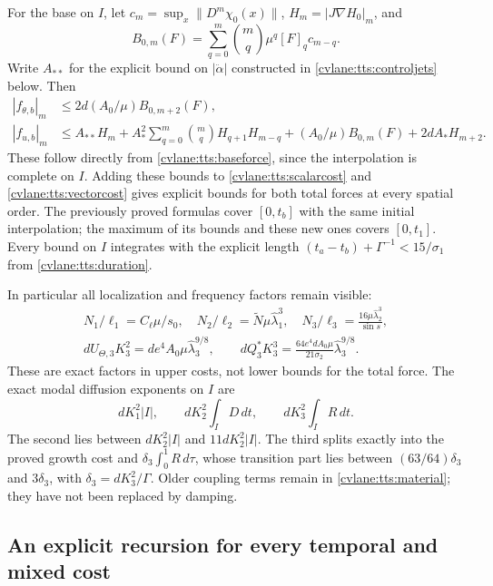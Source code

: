 For the base on $I$, let
$c_m=\sup_x\|D^m\chi_0(x)\|$, $H_m=|J\nabla H_0|_m$, and
\[
 B_{0,m}(F)=\sum_{q=0}^m\binom mq\mu^q[F]_qc_{m-q}.
\]
Write $A_{**}$ for the explicit bound on $|\ddot\alpha|$
constructed in \eqref{cvlane:tts:controljets} below. Then
\begin{align}\label{cvlane:tts:basecost}
 |f_{\theta,b}|_m&\leq2d(A_0/\mu)B_{0,m+2}(F),\nonumber\\
 |f_{u,b}|_m&\leq A_{**}H_m+
 A_*^2\sum_{q=0}^m\binom mq H_{q+1}H_{m-q}
 +(A_0/\mu)B_{0,m}(F)+2dA_*H_{m+2}.
\end{align}
These follow directly from \eqref{cvlane:tts:baseforce}, since the
interpolation is complete on $I$. Adding these bounds to
\eqref{cvlane:tts:scalarcost} and \eqref{cvlane:tts:vectorcost} gives explicit
bounds for both total forces at every spatial order. The previously
proved formulas cover $[0,t_b]$ with the same initial interpolation;
the maximum of its bounds and these new ones covers $[0,t_1]$.
Every bound on $I$ integrates with the explicit length
$(t_a-t_b)+\Gamma^{-1}<15/\sigma_1$ from \eqref{cvlane:tts:duration}.

In particular all localization and frequency factors remain visible:
\begin{equation}\label{cvlane:tts:frequencycost}
 \begin{gathered}
 N_1/\ell_1=C_\ell\mu/s_0,\quad
 N_2/\ell_2=\widetilde N\mu\widehat\lambda_1^3,\quad
 N_3/\ell_3=\frac{16\mu\widehat\lambda_2^3}{\sin s},\\
 dU_{\Theta,3}K_3^2
       =de^4A_0\mu\widehat\lambda_3^{9/8},\qquad
 dQ_3^*K_3^3
       =\frac{64e^4dA_0\mu}{21\sigma_2}
                                      \widehat\lambda_3^{9/8}.
 \end{gathered}
\end{equation}
These are exact factors in upper costs, not lower bounds for the
total force. The exact modal diffusion exponents on $I$ are
\begin{equation}\label{cvlane:tts:exponents}
 dK_1^2|I|,\qquad dK_2^2\int_I D\,dt,\qquad
 dK_3^2\int_I R\,dt.
\end{equation}
The second lies between $dK_2^2|I|$ and $11dK_2^2|I|$.
The third splits exactly into the proved growth cost and
$\delta_3\int_0^1R\,d\tau$, whose transition part lies between
$(63/64)\delta_3$ and $3\delta_3$, with
$\delta_3=dK_3^2/\Gamma$. Older coupling terms remain in
\eqref{cvlane:tts:material}; they have not been replaced by damping.

\subsection{An explicit recursion for every temporal and mixed cost}

